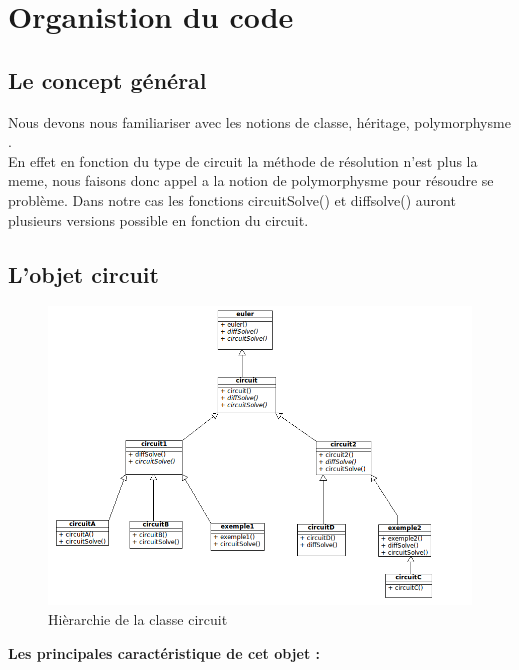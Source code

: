 \documentclass[a4paper,11pt]{article}
\begin{document}
\section{Organistion du code}
  \subsection{Le concept général}
  Nous devons nous familiariser avec les notions de classe, héritage, polymorphysme .\\
  En effet en fonction du type de circuit la méthode de
  résolution n'est plus la meme, nous faisons donc appel a la notion de polymorphysme pour résoudre se problème. Dans notre cas les fonctions 
  circuitSolve() et diffsolve() auront plusieurs versions possible en fonction du circuit.
  \subsection{L'objet circuit}
    \begin{figure}[H]
	 \begin{center}
	  \includegraphics[scale=.5]{circuitDiagram}
	\caption{Hièrarchie de la classe circuit}
	\end{center}
      \end{figure}
    \textbf{Les principales caractéristique de cet objet :}\\
\end{document}
